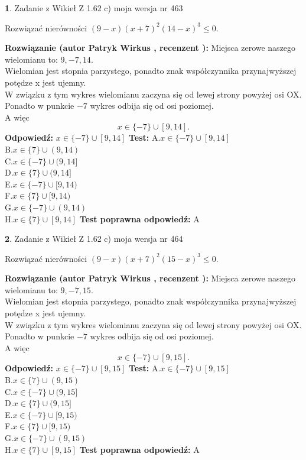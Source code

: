 \documentclass[12pt, a4paper]{article}
\theoremstyle{definition} %
\newtheorem{zad}{}
\newcommand{\zadStart}[1]{\begin{zad}#1\newline}
\newcommand{\zadStop}{\end{zad}}
\newcommand{\rozwStart}[2]{\noindent \textbf{Rozwiązanie (autor #1 , recenzent #2): }\newline}
\newcommand{\rozwStop}{\newline}
\newcommand{\odpStart}{\noindent \textbf{Odpowiedź:}\newline}
\newcommand{\odpStop}{\newline}
\newcommand{\testStart}{\noindent \textbf{Test:}\newline}
\newcommand{\testStop}{\newline}
\newcommand{\kluczStart}{\noindent \textbf{Test poprawna odpowiedź:}\newline}
\newcommand{\kluczStop}{\newline}
\begin{document}
\zadStart{Zadanie z Wikieł Z 1.62 c) moja wersja nr 463}

Rozwiązać nierówności $(9-x)(x+7)^{2}(14-x)^{3}\le0$.
\zadStop
\rozwStart{Patryk Wirkus}{}
Miejsca zerowe naszego wielomianu to: $9, -7, 14$.\\
Wielomian jest stopnia parzystego, ponadto znak współczynnika przy\linebreak najwyższej potędze x jest ujemny.\\ W związku z tym wykres wielomianu zaczyna się od lewej strony powyżej osi OX.\\
Ponadto w punkcie $-7$ wykres odbija się od osi poziomej.\\
A więc $$x \in \{-7\} \cup [9,14].$$
\rozwStop
\odpStart
$x \in \{-7\} \cup [9,14]$
\odpStop
\testStart
A.$x \in \{-7\} \cup [9,14]$\\
B.$x \in \{7\} \cup (9,14)$\\
C.$x \in \{-7\} \cup (9,14]$\\
D.$x \in \{7\} \cup (9,14]$\\
E.$x \in \{-7\} \cup [9,14)$\\
F.$x \in \{7\} \cup [9,14)$\\
G.$x \in \{-7\} \cup (9,14)$\\
H.$x \in \{7\} \cup [9,14]$
\testStop
\kluczStart
A
\kluczStop



\zadStart{Zadanie z Wikieł Z 1.62 c) moja wersja nr 464}

Rozwiązać nierówności $(9-x)(x+7)^{2}(15-x)^{3}\le0$.
\zadStop
\rozwStart{Patryk Wirkus}{}
Miejsca zerowe naszego wielomianu to: $9, -7, 15$.\\
Wielomian jest stopnia parzystego, ponadto znak współczynnika przy\linebreak najwyższej potędze x jest ujemny.\\ W związku z tym wykres wielomianu zaczyna się od lewej strony powyżej osi OX.\\
Ponadto w punkcie $-7$ wykres odbija się od osi poziomej.\\
A więc $$x \in \{-7\} \cup [9,15].$$
\rozwStop
\odpStart
$x \in \{-7\} \cup [9,15]$
\odpStop
\testStart
A.$x \in \{-7\} \cup [9,15]$\\
B.$x \in \{7\} \cup (9,15)$\\
C.$x \in \{-7\} \cup (9,15]$\\
D.$x \in \{7\} \cup (9,15]$\\
E.$x \in \{-7\} \cup [9,15)$\\
F.$x \in \{7\} \cup [9,15)$\\
G.$x \in \{-7\} \cup (9,15)$\\
H.$x \in \{7\} \cup [9,15]$
\testStop
\kluczStart
A
\kluczStop
\end{document}
